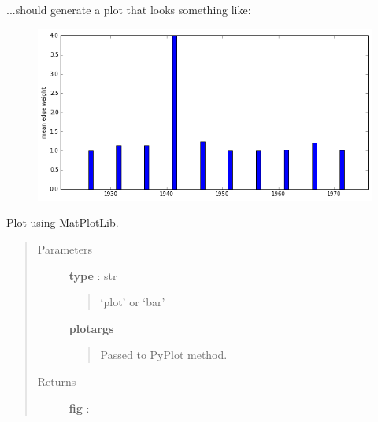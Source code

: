 \documentclass[letterpaper,10pt,english]{sphinxmanual}
\begin{document}
\begin{fulllineitems}
\begin{fulllineitems}
...should generate a plot that looks something like:
\begin{figure}[htbp]
\centering

\includegraphics{graph_plot_attr_distribution.png}
\end{figure}

\end{fulllineitems}


\begin{fulllineitems}
\label{tethne.classes.graphcollection:tethne.classes.graphcollection.GraphCollection.plot_edge_distribution}
Plot {\hyperref[tethne.classes.graphcollection:tethne.classes.graphcollection.GraphCollection.edge_distribution]{}} using \href{http://matplotlib.org}{MatPlotLib}.
\begin{quote}\begin{description}
\item[{Parameters}] \leavevmode
\textbf{type} : str
\begin{quote}

`plot' or `bar'
\end{quote}

\textbf{plotargs}
\begin{quote}

Passed to PyPlot method.
\end{quote}

\item[{Returns}] \leavevmode
\textbf{fig} : 

\end{description}\end{quote}

\end{fulllineitems}
\end{fulllineitems}
\end{document}
